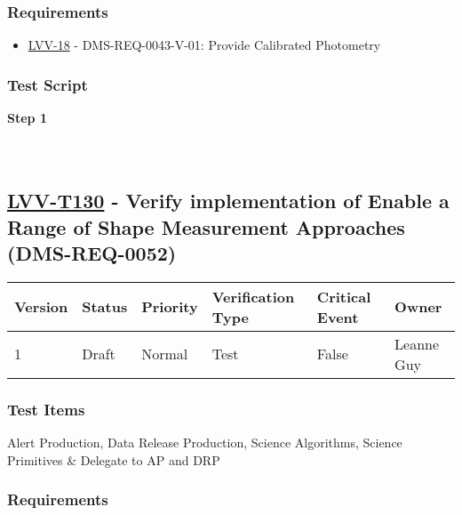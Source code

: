 \hypertarget{requirements-29}{%
\subsubsection{Requirements}\label{requirements-29}}

\begin{itemize}
\tightlist
\item
  \href{https://jira.lsstcorp.org/browse/LVV-18}{LVV-18} -
  DMS-REQ-0043-V-01: Provide Calibrated Photometry
\end{itemize}

\hypertarget{test-script-29}{%
\subsubsection{Test Script}\label{test-script-29}}

\textbf{Step 1}\\
~\\
~\\

\hypertarget{lvv-t130---verify-implementation-of-enable-a-range-of-shape-measurement-approaches-dms-req-0052}{%
\subsection{\texorpdfstring{\href{https://jira.lsstcorp.org/secure/Tests.jspa\#/testCase/LVV-T130}{LVV-T130}
- Verify implementation of Enable a Range of Shape Measurement
Approaches
(DMS-REQ-0052)}{LVV-T130 - Verify implementation of Enable a Range of Shape Measurement Approaches (DMS-REQ-0052)}}\label{lvv-t130---verify-implementation-of-enable-a-range-of-shape-measurement-approaches-dms-req-0052}}

\begin{longtable}[]{@{}llllll@{}}
\toprule
Version & Status & Priority & Verification Type & Critical Event &
Owner\tabularnewline
\midrule
\endhead
1 & Draft & Normal & Test & False & Leanne Guy\tabularnewline
\bottomrule
\end{longtable}

\hypertarget{test-items-30}{%
\subsubsection{Test Items}\label{test-items-30}}

Alert Production, Data Release Production, Science Algorithms, Science
Primitives \& Delegate to AP and DRP

\hypertarget{requirements-30}{%
\subsubsection{Requirements}\label{requirements-30}}

